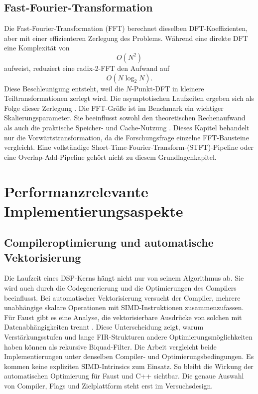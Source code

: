 \subsection{Fast-Fourier-Transformation}
Die Fast-Fourier-Transformation (FFT) berechnet dieselben DFT-Koeffizienten, aber mit einer effizienteren Zerlegung des Problems. Während eine direkte DFT eine Komplexität von
\begin{equation}
	O(N^2)
\end{equation}
aufweist, reduziert eine radix-2-FFT \parencite{lyons2004understanding} den Aufwand auf
\begin{equation}
	O(N\log_2 N).
\end{equation}
\noindent Diese Beschleunigung entsteht, weil die $N$-Punkt-DFT in kleinere Teiltransformationen zerlegt wird. Die asymptotischen Laufzeiten ergeben sich als Folge dieser Zerlegung \parencite[S.~127--134]{tan2018digital}.
Die FFT-Größe ist im Benchmark ein wichtiger Skalierungsparameter. Sie beeinflusst sowohl den theoretischen Rechenaufwand als auch die praktische Speicher- und Cache-Nutzung \parencite[S. 127-134]{tan2018digital}. Dieses Kapitel behandelt nur die Vorwärtstransformation, da die Forschungsfrage einzelne FFT-Bausteine vergleicht. Eine vollständige Short-Time-Fourier-Transform-(STFT)-Pipeline oder eine Overlap-Add-Pipeline gehört nicht zu diesem Grundlagenkapitel.
\section{Performanzrelevante Implementierungsaspekte}
\label{sec:performanzgrundlagen}
\subsection{Compileroptimierung und automatische Vektorisierung}
Die Laufzeit eines DSP-Kerns hängt nicht nur von seinem Algorithmus ab. Sie wird auch durch die Codegenerierung und die Optimierungen des Compilers beeinflusst. Bei automatischer Vektorisierung versucht der Compiler, mehrere unabhängige skalare Operationen mit SIMD-Instruktionen zusammenzufassen. Für Faust gibt es eine Analyse, die vektorisierbare Ausdrücke von solchen mit Datenabhängigkeiten trennt \parencite[S.~15]{orlarey:hal-02159014}. Diese Unterscheidung zeigt, warum Verstärkungsstufen und lange FIR-Strukturen andere Optimierungsmöglichkeiten haben können als rekursive Biquad-Filter.
Die Arbeit vergleicht beide Implementierungen unter denselben Compiler- und Optimierungsbedingungen. Es kommen keine expliziten SIMD-Intrinsics zum Einsatz. So bleibt die Wirkung der automatischen Optimierung für Faust und C++ sichtbar. Die genaue Auswahl von Compiler, Flags und Zielplattform steht erst im Versuchsdesign.
